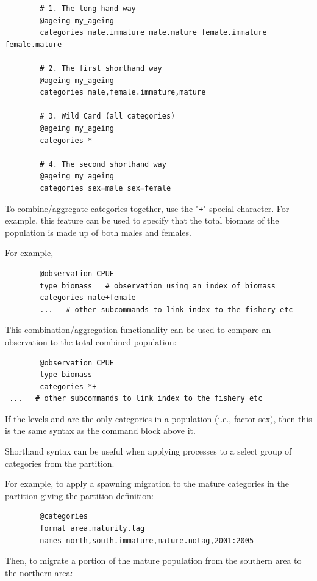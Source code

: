{\small{\begin{verbatim}
		# 1. The long-hand way
		@ageing my_ageing
		categories male.immature male.mature female.immature female.mature

		# 2. The first shorthand way
		@ageing my_ageing
		categories male,female.immature,mature

		# 3. Wild Card (all categories)
		@ageing my_ageing
		categories *

		# 4. The second shorthand way
		@ageing my_ageing
		categories sex=male sex=female
\end{verbatim}}}

To combine/aggregate categories together, use the "\texttt{+}" special character. For example, this feature can be used to specify that the total biomass of the population is made up of both males and females.

For example,

{\small{\begin{verbatim}
		@observation CPUE
		type biomass   # observation using an index of biomass
		categories male+female
        ...   # other subcommands to link index to the fishery etc
\end{verbatim}}}

This combination/aggregation functionality can be used to compare an observation to the total combined population:

{\small{\begin{verbatim}
		@observation CPUE
		type biomass
		categories *+
 ...   # other subcommands to link index to the fishery etc
		\end{verbatim}}}

If the levels  and  are the only categories in a population (i.e., factor sex), then this is the same syntax as the command block above it.

Shorthand syntax can be useful when applying processes to a select group of categories from the partition.

For example, to apply a spawning migration to the mature categories in the partition giving the partition definition:

{\small{\begin{verbatim}
		@categories
		format area.maturity.tag
		names north,south.immature,mature.notag,2001:2005
\end{verbatim}}}

Then, to migrate a portion of the mature population from the southern area to the northern area:

